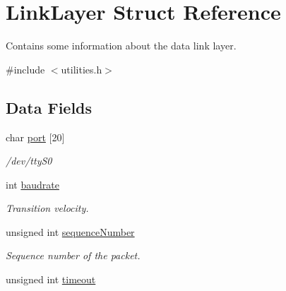 \hypertarget{struct_link_layer}{}\section{Link\+Layer Struct Reference}
\label{struct_link_layer}


Contains some information about the data link layer.  




{\ttfamily \#include $<$utilities.\+h$>$}

\subsection*{Data Fields}
\begin{DoxyCompactItemize}
\item 
char \hyperlink{struct_link_layer_a0039909ad31932ecb4f823209dc8d673}{port} \mbox{[}20\mbox{]}\hypertarget{struct_link_layer_a0039909ad31932ecb4f823209dc8d673}{}\label{struct_link_layer_a0039909ad31932ecb4f823209dc8d673}

\begin{DoxyCompactList}\small\item\em /dev/tty\+S0 \end{DoxyCompactList}\item 
int \hyperlink{struct_link_layer_a513ce28a23cc7740b2444c0f1fc671c1}{baudrate}\hypertarget{struct_link_layer_a513ce28a23cc7740b2444c0f1fc671c1}{}\label{struct_link_layer_a513ce28a23cc7740b2444c0f1fc671c1}

\begin{DoxyCompactList}\small\item\em Transition velocity. \end{DoxyCompactList}\item 
unsigned int \hyperlink{struct_link_layer_a2a181002fca43efafda1fce8601b7f94}{sequence\+Number}\hypertarget{struct_link_layer_a2a181002fca43efafda1fce8601b7f94}{}\label{struct_link_layer_a2a181002fca43efafda1fce8601b7f94}

\begin{DoxyCompactList}\small\item\em Sequence number of the packet. \end{DoxyCompactList}\item 
unsigned int \hyperlink{struct_link_layer_a7f87c6463bd3633e2e75f12628f35410}{timeout}\hypertarget{struct_link_layer_a7f87c6463bd3633e2e75f12628f35410}{}\label{struct_link_layer_a7f87c6463bd3633e2e75f12628f35410}


\end{DoxyCompactItemize}
